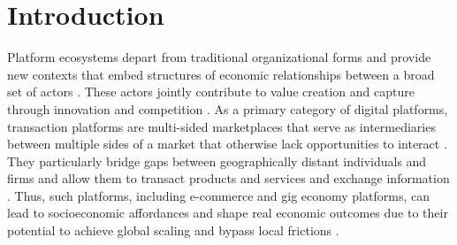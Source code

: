 \documentclass[letterpaper,12pt]{article}
\begin{document}


\section{Introduction}



Platform ecosystems depart from traditional organizational forms and provide new contexts that embed structures of economic relationships between a broad set of actors \citep{mcintyre_multisided_2021,jacobides_towards_2018,kretschmer_platform_2021}. These actors jointly contribute to value creation and capture through innovation and competition \citep{gawer_bridging_2014}. As a primary category of digital platforms, transaction platforms are multi-sided marketplaces that serve as intermediaries between multiple sides of a market that otherwise lack opportunities to interact \citep{rochet_platform_2003}. They particularly bridge gaps between geographically distant individuals and firms and allow them to transact products and services and exchange information \citep{afuah_crowdsourcing_2012,cusumano_business_2019}. Thus, such platforms, including e-commerce and gig economy platforms, can lead to socioeconomic affordances and shape real economic outcomes due to their potential to achieve global scaling and bypass local frictions \citep{bonina_digital_2021}.
\end{document}
